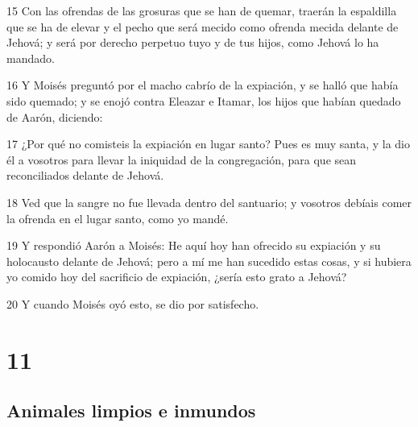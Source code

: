 \par 15 Con las ofrendas de las grosuras que se han de quemar, traerán la espaldilla que se ha de elevar y el pecho que será mecido como ofrenda mecida delante de Jehová; y será por derecho perpetuo tuyo y de tus hijos, como Jehová lo ha mandado.
\par 16 Y Moisés preguntó por el macho cabrío de la expiación, y se halló que había sido quemado; y se enojó contra Eleazar e Itamar, los hijos que habían quedado de Aarón, diciendo:
\par 17 ¿Por qué no comisteis la expiación en lugar santo? Pues es muy santa, y la dio él a vosotros para llevar la iniquidad de la congregación, para que sean reconciliados delante de Jehová.
\par 18 Ved que la sangre no fue llevada dentro del santuario; y vosotros debíais comer la ofrenda en el lugar santo, como yo mandé.
\par 19 Y respondió Aarón a Moisés: He aquí hoy han ofrecido su expiación y su holocausto delante de Jehová; pero a mí me han sucedido estas cosas, y si hubiera yo comido hoy del sacrificio de expiación, ¿sería esto grato a Jehová?
\par 20 Y cuando Moisés oyó esto, se dio por satisfecho.

\chapter{11}

\section*{Animales limpios e inmundos}

